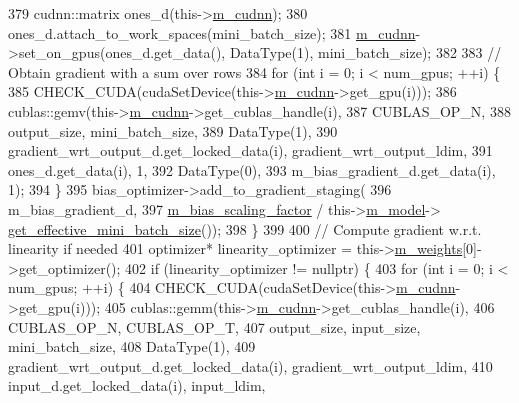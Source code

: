 \begin{DoxyCode}
379       cudnn::matrix ones\_d(this->\hyperlink{classlbann_1_1Layer_a08dbb94239e3b8c96329786c57c72e21}{m\_cudnn});
380       ones\_d.attach\_to\_work\_spaces(mini\_batch\_size);
381       \hyperlink{classlbann_1_1Layer_a08dbb94239e3b8c96329786c57c72e21}{m\_cudnn}->set\_on\_gpus(ones\_d.get\_data(), DataType(1), mini\_batch\_size);
382 
383       \textcolor{comment}{// Obtain gradient with a sum over rows}
384       \textcolor{keywordflow}{for} (\textcolor{keywordtype}{int} i = 0; i < num\_gpus; ++i) \{
385         CHECK\_CUDA(cudaSetDevice(this->\hyperlink{classlbann_1_1Layer_a08dbb94239e3b8c96329786c57c72e21}{m\_cudnn}->get\_gpu(i)));
386         cublas::gemv(this->\hyperlink{classlbann_1_1Layer_a08dbb94239e3b8c96329786c57c72e21}{m\_cudnn}->get\_cublas\_handle(i),
387                      CUBLAS\_OP\_N, 
388                      output\_size, mini\_batch\_size,
389                      DataType(1),
390                      gradient\_wrt\_output\_d.get\_locked\_data(i), gradient\_wrt\_output\_ldim,
391                      ones\_d.get\_data(i), 1,
392                      DataType(0),
393                      m\_bias\_gradient\_d.get\_data(i), 1);
394       \}
395       bias\_optimizer->add\_to\_gradient\_staging(
396         m\_bias\_gradient\_d,
397         \hyperlink{classlbann_1_1fully__connected__layer_ae02eaffd5528bf572883f8b06d1b40c0}{m\_bias\_scaling\_factor} / this->\hyperlink{classlbann_1_1Layer_a3d9315e99574166f2f33e37b572021d2}{m\_model}->
      \hyperlink{classlbann_1_1model_a2a9b4cfa1c8c91e4131908751f9c4a6a}{get\_effective\_mini\_batch\_size}());
398     \}
399       
400     \textcolor{comment}{// Compute gradient w.r.t. linearity if needed}
401     optimizer* linearity\_optimizer = this->\hyperlink{classlbann_1_1Layer_a7954e30fbf9100a6ba4b56d02767a469}{m\_weights}[0]->get\_optimizer();
402     \textcolor{keywordflow}{if} (linearity\_optimizer != \textcolor{keyword}{nullptr}) \{
403       \textcolor{keywordflow}{for} (\textcolor{keywordtype}{int} i = 0; i < num\_gpus; ++i) \{
404         CHECK\_CUDA(cudaSetDevice(this->\hyperlink{classlbann_1_1Layer_a08dbb94239e3b8c96329786c57c72e21}{m\_cudnn}->get\_gpu(i)));
405         cublas::gemm(this->\hyperlink{classlbann_1_1Layer_a08dbb94239e3b8c96329786c57c72e21}{m\_cudnn}->get\_cublas\_handle(i),
406                      CUBLAS\_OP\_N, CUBLAS\_OP\_T,
407                      output\_size, input\_size, mini\_batch\_size,
408                      DataType(1),
409                      gradient\_wrt\_output\_d.get\_locked\_data(i), gradient\_wrt\_output\_ldim,
410                      input\_d.get\_locked\_data(i), input\_ldim,

\end{DoxyCode}
